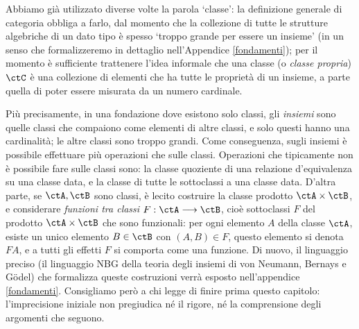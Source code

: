 \begin{remark}
	Abbiamo già utilizzato diverse volte la parola `classe': la definizione generale di categoria obbliga a farlo, dal momento che la collezione di tutte le strutture algebriche di un dato tipo è spesso `troppo grande per essere un insieme' (in un senso che formalizzeremo in dettaglio nell'Appendice \ref{fondamenti}); per il momento è sufficiente trattenere l'idea informale che una classe (o \emph{classe propria}) \(\ctC\) è una collezione di elementi che ha tutte le proprietà di un insieme, a parte quella di poter essere misurata da un numero cardinale.

	Più precisamente, in una fondazione dove esistono solo classi, gli \emph{insiemi} sono quelle classi che compaiono come elementi di altre classi, e solo questi hanno una cardinalità; le altre classi sono troppo grandi. Come conseguenza, sugli insiemi è possibile effettuare più operazioni che sulle classi. Operazioni che tipicamente non è possibile fare sulle classi sono: la classe quoziente di una relazione d'equivalenza su una classe data, e la classe di tutte le sottoclassi a una classe data.
	D'altra parte, se \(\ctA,\ctB\) sono classi, è lecito costruire la classe prodotto \(\ctA\times\ctB\), e considerare \emph{funzioni tra classi} \(F : \ctA\fun\ctB\), cioè sottoclassi \(F\) del prodotto \(\ctA\times\ctB\) che sono funzionali: per ogni elemento \(A\) della classe \(\ctA\), esiste un unico elemento \(B\in\ctB\) con \((A,B)\in F\), questo elemento si denota \(FA\), e a tutti gli effetti \(F\) si comporta come una funzione. Di nuovo, il linguaggio preciso (il linguaggio \textsf{NBG} della teoria degli insiemi di von Neumann, Bernays e G\"odel) che formalizza queste costruzioni verrà esposto nell'appendice \ref{fondamenti}. Consigliamo però a chi legge di finire prima questo capitolo: l'imprecisione iniziale non pregiudica né il rigore, né la comprensione degli argomenti che seguono.
\end{remark}
